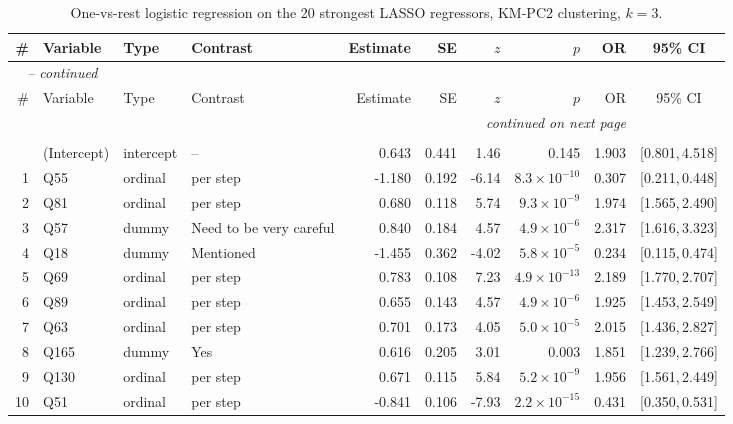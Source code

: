 \begin{landscape}
\begingroup\footnotesize
\begin{longtable}{r l l l r r r r r c}
\caption{One-vs-rest logistic regression on the 20 strongest LASSO regressors, KM-PC2 clustering, $k = 3$.}\label{tab:logit-KMPC2-k3}\\
\toprule
\# & Variable & Type & Contrast & Estimate & SE & $z$ & $p$ & OR & 95\% CI \\
\midrule
\endfirsthead
\multicolumn{9}{l}{\emph{\tablename\ \thetable{} -- continued}}\\
\toprule
\# & Variable & Type & Contrast & Estimate & SE & $z$ & $p$ & OR & 95\% CI \\
\midrule
\endhead
\midrule \multicolumn{9}{r}{\emph{continued on next page}}\\
\endfoot
\bottomrule
\endlastfoot
\multicolumn{9}{l}{\textbf{Cluster 1} \quad \small $n = 2579$ ($n_{\text{in}} = 771$), AIC $= 1244.2$, residual deviance $= 1202.2$ on 2558 df}\\[2pt]
\rowcolor{gray!12}  & (Intercept) & intercept & -- & 0.643 & 0.441 & 1.46 & 0.145 & 1.903 & [0.801,\,4.518] &  \\
1 & Q55 & ordinal & per step & -1.180 & 0.192 & -6.14 & $8.3{\times}10^{-10}$ & 0.307 & [0.211,\,0.448] &  \\
2 & Q81 & ordinal & per step & 0.680 & 0.118 & 5.74 & $9.3{\times}10^{-9}$ & 1.974 & [1.565,\,2.490] &  \\
3 & Q57 & dummy & Need to be very careful & 0.840 & 0.184 & 4.57 & $4.9{\times}10^{-6}$ & 2.317 & [1.616,\,3.323] &  \\
4 & Q18 & dummy & Mentioned & -1.455 & 0.362 & -4.02 & $5.8{\times}10^{-5}$ & 0.234 & [0.115,\,0.474] &  \\
5 & Q69 & ordinal & per step & 0.783 & 0.108 & 7.23 & $4.9{\times}10^{-13}$ & 2.189 & [1.770,\,2.707] &  \\
6 & Q89 & ordinal & per step & 0.655 & 0.143 & 4.57 & $4.9{\times}10^{-6}$ & 1.925 & [1.453,\,2.549] &  \\
7 & Q63 & ordinal & per step & 0.701 & 0.173 & 4.05 & $5.0{\times}10^{-5}$ & 2.015 & [1.436,\,2.827] &  \\
8 & Q165 & dummy & Yes & 0.616 & 0.205 & 3.01 & 0.003 & 1.851 & [1.239,\,2.766] &  \\
9 & Q130 & ordinal & per step & 0.671 & 0.115 & 5.84 & $5.2{\times}10^{-9}$ & 1.956 & [1.561,\,2.449] &  \\
10 & Q51 & ordinal & per step & -0.841 & 0.106 & -7.93 & $2.2{\times}10^{-15}$ & 0.431 & [0.350,\,0.531] &  \\

\end{longtable}
\end{landscape}
